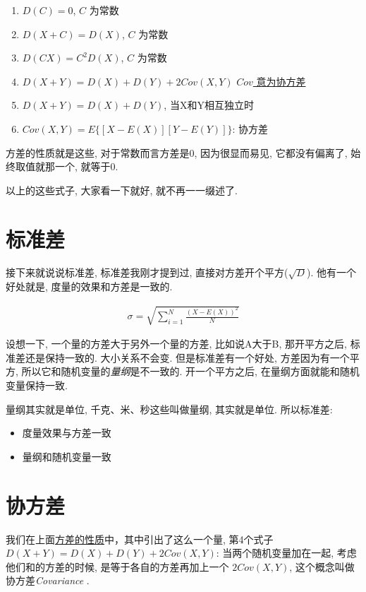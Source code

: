\begin{enumerate}
  \item $D(C)=0$,  $C$ 为常数
  \item $D(X+C) = D(X)$, $C$ 为常数
  \item $D(CX) = C^2D(X)$, $C$ 为常数
  \item $D(X+Y) = D(X) + D(Y) + 2Cov(X,Y)$ \hyperlink{协方差}{$Cov$ 意为协方差}
  \item $D(X+Y) = D(X) +D(Y)$,  当X和Y相互独立时
  \item $Cov(X, Y) = E\{[X - E(X)][Y-E(Y)]\}$:  协方差
\end{enumerate}

方差的性质就是这些, 对于常数而言方差是0, 因为很显而易见, 它都没有偏离了, 始终取值就那一个, 就等于0. 

以上的这些式子, 大家看一下就好, 就不再一一缀述了. 

\section{标准差}

接下来就说说标准差, 标准差我刚才提到过, 直接对方差开个平方($\sqrt{D}$). 他有一个好处就是, 度量的效果和方差是一致的. 

\begin{align*}
  \sigma  = \sqrt{\sum^N_{i=1}\frac{(X-E(X))^2}{N}}
\end{align*}

设想一下, 一个量的方差大于另外一个量的方差, 比如说A大于B, 那开平方之后, 标准差还是保持一致的. 大小关系不会变. 但是标准差有一个好处, 方差因为有一个平方, 所以它和随机变量的\textit{量纲}是不一致的. 开一个平方之后, 在量纲方面就能和随机变量保持一致. 

量纲其实就是单位, 千克、米、秒这些叫做量纲, 其实就是单位. 所以标准差:

\begin{itemize}
  \item 度量效果与方差一致
  \item 量纲和随机变量一致
\end{itemize}

\hypertarget{协方差}{}
\section{协方差}

我们在上面\hyperlink{方差的性质}{方差的性质}中，其中引出了这么一个量, 第4个式子 $D(X+Y) = D(X) + D(Y) + 2Cov(X,Y)$: 当两个随机变量加在一起, 考虑他们和的方差的时候, 是等于各自的方差再加上一个 $2Cov(X,Y)$, 这个概念叫做协方差\textit{Covariance} . 


